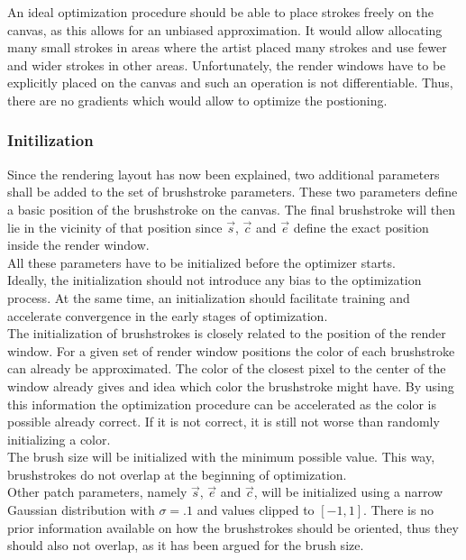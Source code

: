 An ideal optimization procedure should be able to place strokes freely on the canvas, as this allows for an unbiased approximation.
It would allow allocating many small strokes in areas where the artist placed many strokes and use fewer and wider strokes in other areas.
Unfortunately, the render windows have to be explicitly placed on the canvas and such an operation is not differentiable.
Thus, there are no gradients which would allow to optimize the postioning.

\subsubsection{Initilization}
Since the rendering layout has now been explained, two additional parameters shall be added to the set of brushstroke parameters.
These two parameters define a basic position of the brushstroke on the canvas.
The final brushstroke will then lie in the vicinity of that position since $\vec{s}$, $\vec{c}$ and $\vec{e}$ define the exact position inside the render window.\\
All these parameters have to be initialized before the optimizer starts.\\
Ideally, the initialization should not introduce any bias to the optimization process.
At the same time, an initialization should facilitate training and accelerate convergence in the early stages of optimization.\\
The initialization of brushstrokes is closely related to the position of the render window.
For a given set of render window positions the color of each brushstroke can already be approximated.
The color of the closest pixel to the center of the window already gives and idea which color the brushstroke might have.
By using this information the optimization procedure can be accelerated as the color is possible already correct.
If it is not correct, it is still not worse than randomly initializing a color.\\
The brush size will be initialized with the minimum possible value.
This way, brushstrokes do not overlap at the beginning of optimization.\\
Other patch parameters, namely $\vec{s}$, $\vec{e}$ and $\vec{c}$, will be initialized using a narrow Gaussian distribution with $\sigma = .1$ and values clipped to $[-1, 1]$.
There is no prior information available on how the brushstrokes should be oriented, thus they should also not overlap, as it has been argued for the brush size.

